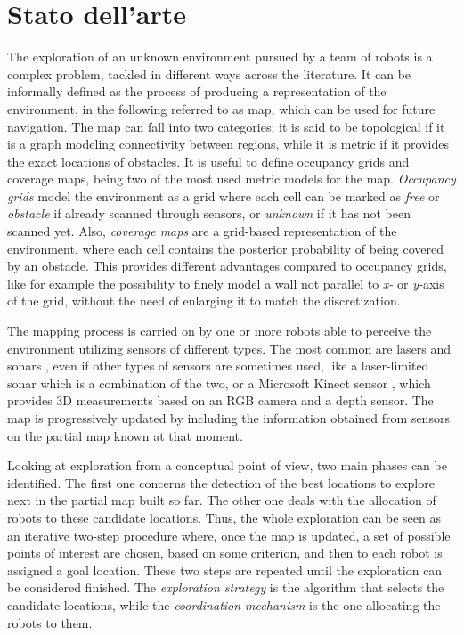 \chapter{Stato dell'arte}
\label{capitolo2}
\thispagestyle{empty}

The exploration of an unknown environment pursued by a team of robots
is a complex problem, tackled in different ways across the literature.
It can be informally defined as the process of producing a representation
of the environment, in the following referred to as map, which can
be used for future navigation. The map can fall into two categories;
it is said to be topological if it is a graph modeling connectivity
between regions, while it is metric if it provides the exact locations
of obstacles. It is useful to define occupancy grids and coverage
maps, being two of the most used metric models for the map. \emph{Occupancy
grids} model the environment as a grid where each cell can be marked
as \emph{free }or \emph{obstacle} if already scanned through sensors,
or \emph{unknown} if it has not been scanned yet. Also, \emph{coverage
maps} are a grid-based representation of the environment, where each
cell contains the posterior probability of being covered by an obstacle.
This provides different advantages compared to occupancy grids, like
for example the possibility to finely model a wall not parallel to
\emph{x- }or \emph{y-}axis of the grid, without the need of enlarging
it to match the discretization. 

The mapping process is carried on by one or more robots able to perceive
the environment utilizing sensors of different types. The most common
are lasers \cite{Burgard2005,Gomez2019} and sonars \cite{Guzzoni1997}, even if other
types of sensors are sometimes used, like a laser-limited sonar \cite{Yamauchi,Yamauchi1998}
which is a combination of the two, or a Microsoft Kinect sensor \cite{Rogers2013},
which provides 3D measurements based on an RGB camera and a depth
sensor. The map is progressively updated by including the information
obtained from sensors on the partial map known at that moment. 

Looking at exploration from a conceptual point of view, two main phases
can be identified. The first one concerns the detection of the best
locations to explore next in the partial map built so far. The other
one deals with the allocation of robots to these candidate locations.
Thus, the whole exploration can be seen as an iterative two-step procedure
where, once the map is updated, a set of possible points of interest
are chosen, based on some criterion, and then to each robot is assigned
a goal location. These two steps are repeated until the exploration
can be considered finished. The \emph{exploration strategy} is the
algorithm that selects the candidate locations, while the \emph{coordination
mechanism} is the one allocating the robots to them.

